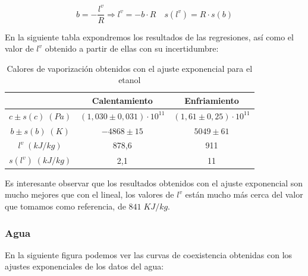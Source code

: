 \documentclass[a4paper,12pt,titlepage]{article}
\begin{document}
\begin{equation}
    b = -\frac{l^v}{R} \Rightarrow l^v = -b\cdot R \quad s(l^v) = R \cdot s(b)
    \label{inc_l^v_2}
\end{equation}

En la siguiente tabla expondremos los resultados de las regresiones, así como el valor de $l^v$ obtenido a partir de ellas con su incertidumbre:

\begin{table}[h!]
\centering
\begin{tabular}{c|c|c|}
\cline{2-3}
    & Calentamiento       & Enfriamiento                    \\ \hline
\multicolumn{1}{|c|}{$c \pm s(c) \;(Pa)$} & $(1,030 \pm 0,031) \cdot 10^{11}$ & $(1,61\pm 0,25) \cdot 10^{11}$  \\ \hline
\multicolumn{1}{|c|}{$b \pm s(b) \; (K)$} & $-4868 \pm 15$   & $5049 \pm 61 $ \\ \hline
\multicolumn{1}{|c|}{$l^v\;(kJ/kg)$}       & 878,6                             & 911                             \\ \hline
\multicolumn{1}{|c|}{$s(l^v)\;(kJ/kg)$}    & 2,1                               & 11                              \\ \hline
\end{tabular}
\caption{Calores de vaporización obtenidos con el ajuste exponencial para el etanol}
\label{tab:my-table}
\end{table}

Es interesante observar que los resultados obtenidos con el ajuste exponencial son mucho mejores que con el lineal, los valores de $l^v$ están mucho más cerca del valor que tomamos como referencia, de $841 \;KJ/kg$.

\newpage

\subsubsection{Agua}

En la siguiente figura podemos ver las curvas de coexistencia obtenidas con los ajustes exponenciales de los datos del agua:
\end{document}
